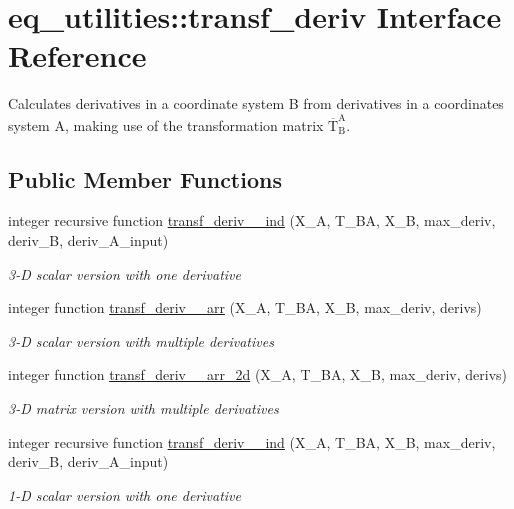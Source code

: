 \hypertarget{interfaceeq__utilities_1_1transf__deriv}{}\section{eq\+\_\+utilities\+:\+:transf\+\_\+deriv Interface Reference}
\label{interfaceeq__utilities_1_1transf__deriv}


Calculates derivatives in a coordinate system B from derivatives in a coordinates system A, making use of the transformation matrix $\overline{\text{T}}_\text{B}^\text{A}$.  


\subsection*{Public Member Functions}
\begin{DoxyCompactItemize}
\item 
integer recursive function \hyperlink{interfaceeq__utilities_1_1transf__deriv_aeb378175eaa132caf243cbd197e2d2ac}{transf\+\_\+deriv\+\_\+\_\+ind} (X\+\_\+A, T\+\_\+\+BA, X\+\_\+B, max\+\_\+deriv, deriv\+\_\+B, deriv\+\_\+\+A\+\_\+input)
\begin{DoxyCompactList}\small\item\em 3-\/D scalar version with one derivative \end{DoxyCompactList}\item 
integer function \hyperlink{interfaceeq__utilities_1_1transf__deriv_abaad10d9fd6035720c2ef74be49e7493}{transf\+\_\+deriv\+\_\+\_\+arr} (X\+\_\+A, T\+\_\+\+BA, X\+\_\+B, max\+\_\+deriv, derivs)
\begin{DoxyCompactList}\small\item\em 3-\/D scalar version with multiple derivatives \end{DoxyCompactList}\item 
integer function \hyperlink{interfaceeq__utilities_1_1transf__deriv_a91c9dd37a0de40fa72441e9c88f94eb0}{transf\+\_\+deriv\+\_\+\_\+arr\+\_\+2d} (X\+\_\+A, T\+\_\+\+BA, X\+\_\+B, max\+\_\+deriv, derivs)
\begin{DoxyCompactList}\small\item\em 3-\/D matrix version with multiple derivatives \end{DoxyCompactList}\item 
integer recursive function \hyperlink{interfaceeq__utilities_1_1transf__deriv_ae0caaaa6fbd6d68f926921b7565ca727}{transf\+\_\+deriv\+\_\+\_\+ind} (X\+\_\+A, T\+\_\+\+BA, X\+\_\+B, max\+\_\+deriv, deriv\+\_\+B, deriv\+\_\+\+A\+\_\+input)
\begin{DoxyCompactList}\small\item\em 1-\/D scalar version with one derivative \end{DoxyCompactList}\end{DoxyCompactItemize}


